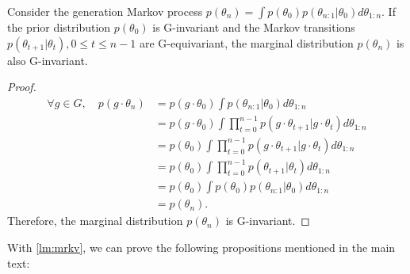 \begin{lemma}
\label{lm:mrkv}
Consider the generation Markov process $p(\theta_n) =\int  p(\theta_0)p(\theta_{n:1}|\theta_0)d\theta_{1:n}$. If the prior distribution $p(\theta_0)$ is G-invariant and the Markov transitions $p(\theta_{t+1}|\theta_t), 0 \leq t\leq n-1$ are G-equivariant, the marginal distribution $p(\theta_n)$ is also G-invariant.
\end{lemma}
\begin{proof}
\begin{align*}
\forall g\in G,\quad p(g\cdot \theta_n) & = p(g\cdot \theta_0)\int p(\theta_{n:1}|\theta_0)d\theta_{1:n}\\
    & = p(g\cdot \theta_0)\int\prod_{t=0}^{n-1} p(g\cdot \theta_{t+1}|g\cdot \theta_{t})d\theta_{1:n}\\
    & = p(\theta_0)\int\prod_{t=0}^{n-1}p(g\cdot \theta_{t+1}|g\cdot \theta_t)d\theta_{1:n}\\
    & = p(\theta_0)\int\prod_{t=0}^{n-1}p(\theta_{t+1}|\theta_t)d\theta_{1:n}\\
    & = p(\theta_0)\int p(\theta_0)p(\theta_{n:1}|\theta_0)d\theta_{1:n}\\
    & = p(\theta_n).
\end{align*}
Therefore, the marginal distribution $p(\theta_n)$ is G-invariant.
\end{proof}
With \cref{lm:mrkv}, we can prove the following propositions mentioned in the main text:
\latticeinv*
